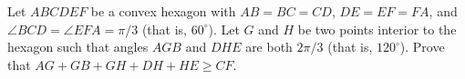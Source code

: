 Let $ABCDEF$ be a convex hexagon with $AB = BC = CD$, $DE = EF = FA$, and $\angle BCD = \angle EFA = \pi/3$ (that is, $60^\circ$). Let $G$ and $H$ be two points interior to the hexagon such that angles $AGB$ and $DHE$ are both $2\pi/3$ (that is, $120^\circ$). Prove that $AG + GB + GH + DH + HE \geq CF$.

